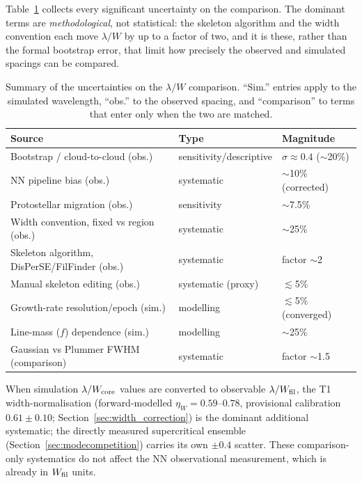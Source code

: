 \documentclass[usenatbib,twoside,twocolumn]{mnras}
\begin{document}
Table~\ref{tab:errorbudget} collects every significant uncertainty on the comparison. The dominant terms are \emph{methodological}, not statistical: the skeleton algorithm and the width convention each move $\lambda/W$ by up to a factor of two, and it is these, rather than the formal bootstrap error, that limit how precisely the observed and simulated spacings can be compared.

\begin{table}
\caption{Summary of the uncertainties on the $\lambda/W$ comparison. ``Sim.'' entries apply to the simulated wavelength, ``obs.'' to the observed spacing, and ``comparison'' to terms that enter only when the two are matched.}
\label{tab:errorbudget}
\footnotesize
\setlength{\tabcolsep}{3pt}
\begin{tabular}{p{3.6cm}p{1.9cm}p{1.7cm}}
\toprule
Source & Type & Magnitude \\
\midrule
Bootstrap / cloud-to-cloud (obs.) & sensitivity/descriptive & $\sigma\approx0.4$ ($\sim$20\%) \\
NN pipeline bias (obs.) & systematic & $\sim$10\% (corrected) \\
Protostellar migration (obs.) & sensitivity & $\sim$7.5\% \\
Width convention, fixed vs region (obs.) & systematic & $\sim$25\% \\
Skeleton algorithm, DisPerSE/FilFinder (obs.) & systematic & factor $\sim$2 \\
Manual skeleton editing (obs.) & systematic (proxy) & $\lesssim$5\% \\
Growth-rate resolution/epoch (sim.) & modelling & $\lesssim$5\% (converged) \\
Line-mass ($f$) dependence (sim.) & modelling & $\sim$25\% \\
Gaussian vs Plummer FWHM (comparison) & systematic & factor $\sim$1.5 \\
\bottomrule
\end{tabular}
\end{table}

When simulation $\lambda/W_{\rm core}$ values are converted to observable $\lambda/W_{\rm fil}$, the T1 width-normalisation (forward-modelled $\eta_W=0.59$--$0.78$, provisional calibration $0.61\pm0.10$; Section~\ref{sec:width_correction}) is the dominant additional systematic; the directly measured supercritical ensemble (Section~\ref{sec:modecompetition}) carries its own $\pm0.4$ scatter. These comparison-only systematics do not affect the NN observational measurement, which is already in $W_{\rm fil}$ units.
\end{document}
